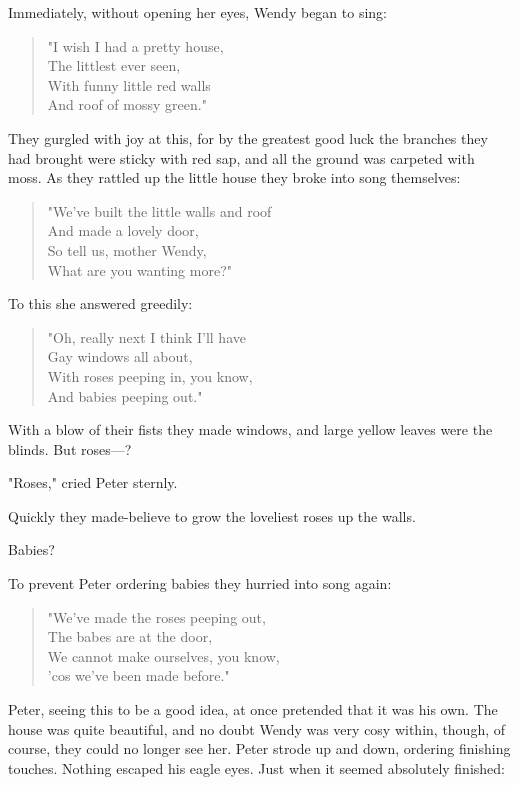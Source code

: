 Immediately, without opening her eyes, Wendy began to sing:

\begin{verse}
	"I wish I had a pretty house,\\
	The littlest ever seen,\\
	With funny little red walls\\
	And roof of mossy green."
\end{verse}

They gurgled with joy at this,
for by the greatest good luck the branches they had brought were sticky with red sap,
and all the ground was carpeted with moss.
As they rattled up the little house they broke into song themselves:

\begin{verse}
	"We've built the little walls and roof\\
	And made a lovely door,\\
	So tell us, mother Wendy,\\
	What are you wanting more?"
\end{verse}

To this she answered greedily:

\begin{verse}
	"Oh, really next I think I'll have\\
	Gay windows all about,\\
	With roses peeping in, you know,\\
	And babies peeping out."
\end{verse}

With a blow of their fists they made windows,
and large yellow leaves were the blinds.
But roses—?

"Roses," cried Peter sternly.

Quickly they made-believe to grow the loveliest roses up the walls.

Babies?

To prevent Peter ordering babies they hurried into song again:

\begin{verse}
	"We've made the roses peeping out,\\
	The babes are at the door,\\
	We cannot make ourselves, you know,\\
	'cos we've been made before."
\end{verse}

Peter, seeing this to be a good idea, at once pretended that it was his own.
The house was quite beautiful, and no doubt Wendy was very cosy within,
though, of course, they could no longer see her.
Peter strode up and down, ordering finishing touches.
Nothing escaped his eagle eyes.
Just when it seemed absolutely finished:

